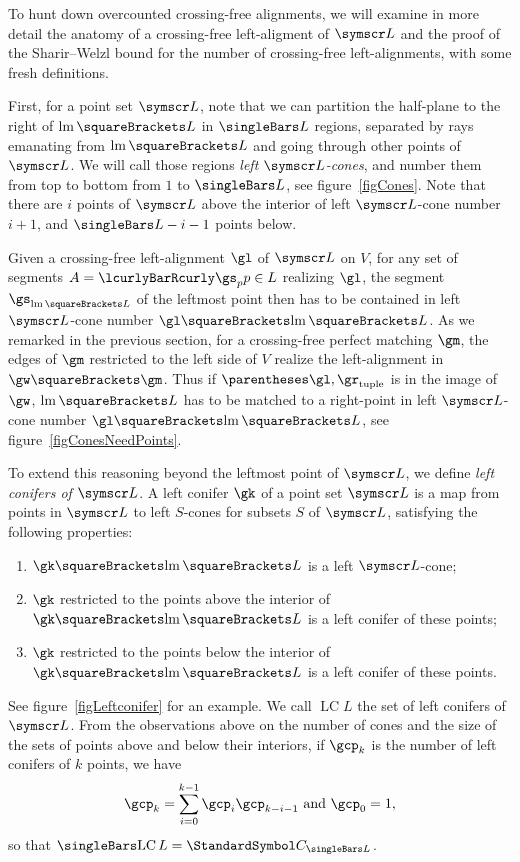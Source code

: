 \documentclass[10pt, a4paper, twoside]{basestyle}
\DeclareMathOperator{\leftmost}{lm}
\DeclareMathOperator{\LC}{LC}
\newcommand{\CatalanNumber}[1]{\StandardSymbol C_{#1}}
\newcommand{\pointset}{\symscr}
\begin{document}
To hunt down overcounted crossing-free alignments, we will examine in more detail the anatomy of a crossing-free
left-aligment of $\pointset L$ and the proof of the Sharir--Welzl bound for the number of crossing-free left-alignments,
with some fresh definitions.

First, for a point set $\pointset L$, note that we can partition the half-plane to the right of $\leftmost\of L$ in
$\Cardinality L$ regions,
separated by rays emanating from $\leftmost\of L$ and going through other points of $\pointset L$. We will call those regions
\emph{left $\pointset L$-cones}, and number them from top to bottom from $1$ to $\Cardinality L$, see figure~\ref{figCones}.
Note that there are $i$ points of $\pointset L$ above the interior of left $\pointset L$-cone
number $i+1$, and $\Cardinality L - i - 1$ points below.

Given a crossing-free left-alignment $\gl$ of $\pointset L$ on $V$, for any set of segments $A=\setst{\gs_p}{p\in L}$
realizing $\gl$, the segment $\gs_{\leftmost\of L}$ of the leftmost point then has to be contained in left
$\pointset L$-cone number $\gl\of{\leftmost\of L}$.
As we remarked in the previous section, for a crossing-free perfect matching $\gm$, the edges of $\gm$ restricted
to the left side of $V$ realize the left-alignment in $\gw\of\gm$. Thus if $\tuple{\gl, \gr}$ is in the image of
$\gw$, $\leftmost\of L$ has to be matched to a right-point in left $\pointset L$-cone number $\gl\of{\leftmost\of L}$, see
figure~\ref{figConesNeedPoints}.

To extend this reasoning beyond the leftmost point of $\pointset L$, we define \emph{left conifers of $\pointset L$}.
A left conifer $\gk$ of a point set $\pointset L$ is a map from points in $\pointset L$ to left $S$-cones for subsets $S$
of $\pointset L$,
satisfying the following properties:
\begin{enumerate}
\item $\gk\of{\leftmost\of L}$ is a left $\pointset L$-cone;
\item $\gk$ restricted to the points above the interior of $\gk\of{\leftmost\of L}$ is a left conifer of these points;
\item $\gk$ restricted to the points below the interior of $\gk\of{\leftmost\of L}$ is a left conifer of these points.
\end{enumerate}
See figure~\ref{figLeftconifer} for an example.
We call $\LC L$ the set of left conifers of $\pointset L$. From the observations above on the number
of cones and the
size of the sets of points above and below their interiors, if $\gcp_k$ is the number of left conifers of $k$ points,
we have
\[
\gcp_k=\sum{i=0}[k-1]\gcp_{i}\gcp_{k-i-1} \text{ and } \gcp_0=1\text,
\]
so that $\Cardinality{\LC L} = \CatalanNumber {\Cardinality L}$.
\end{document}
